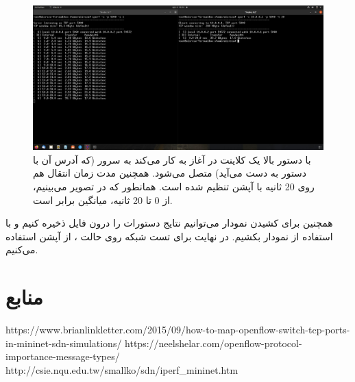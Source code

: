 \documentclass{article}
\begin{document}
\begin{figure}[H]
    \centering
    \includegraphics[width=1.0\textwidth]{figures/2d.jpg}
    \caption
	{
با دستور بالا یک کلاینت  در  آغاز به کار می‌کند به سرور  (که آدرس آن با دستور  به دست می‌آید) متصل می‌شود. همچنین مدت زمان انتقال هم روی 20 ثانیه با آپشن  تنظیم شده است. همانطور که در تصویر می‌بینیم، از 0 تا 20 ثانیه،  میانگین برابر  است.
	}
    \label{fig:fig1}
\end{figure}

همچنین برای کشیدن نمودار می‌توانیم نتایج دستورات را درون فایل ذخیره کنیم و با استفاده از  نمودار بکشیم. در نهایت برای تست شبکه روی حالت ، از آپشن  استفاده می‌کنیم.



\section*{منابع}
\renewcommand{\section}[2]{}%
\begin{thebibliography}{99} %


\begin{LTRitems}

\resetlatinfont

 https://www.brianlinkletter.com/2015/09/how-to-map-openflow-switch-tcp-ports-in-mininet-sdn-simulations/
 https://neelshelar.com/openflow-protocol-importance-message-types/
 http://csie.nqu.edu.tw/smallko/sdn/iperf\_mininet.htm


\end{LTRitems}

\end{thebibliography}
\end{document}
